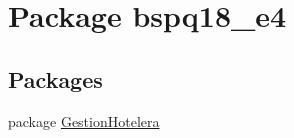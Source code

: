 \hypertarget{namespacebspq18__e4}{}\section{Package bspq18\+\_\+e4}
\label{namespacebspq18__e4}
\subsection*{Packages}
\begin{DoxyCompactItemize}
\item 
package \mbox{\hyperlink{namespacebspq18__e4_1_1_gestion_hotelera}{Gestion\+Hotelera}}
\end{DoxyCompactItemize}
